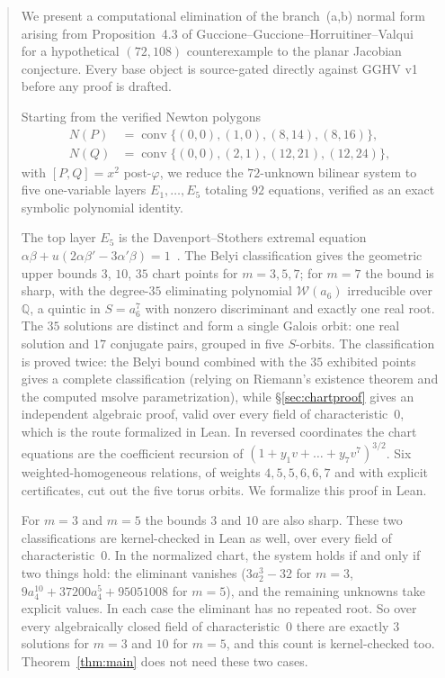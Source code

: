 \documentclass[a4paper,11pt]{article}
\theoremstyle{plain}
\theoremstyle{definition}
\theoremstyle{remark}
\begin{document}
\begin{abstract}
We present a computational elimination of the branch~(a,b) normal form arising from Proposition~4.3 of Guccione--Guccione--Horruitiner--Valqui~\cite{GGHV} for a hypothetical $(72,108)$ counterexample to the planar Jacobian conjecture. Every base object is source-gated directly against GGHV v1 before any proof is drafted.

Starting from the verified Newton polygons
\[
\begin{aligned}
N(P)&=\operatorname{conv}\{(0,0),(1,0),(8,14),(8,16)\},\\
N(Q)&=\operatorname{conv}\{(0,0),(2,1),(12,21),(12,24)\},
\end{aligned}
\]
with $[P,Q]=x^2$ post-$\varphi$, we reduce the $72$-unknown bilinear system to five one-variable layers $E_1,\dots,E_5$ totaling $92$ equations, verified as an exact symbolic polynomial identity.

The top layer $E_5$ is the Davenport--Stothers extremal equation $\alpha\beta+u(2\alpha\beta'-3\alpha'\beta)=1$~\cite{Stothers,Davenport}. The Belyi classification gives the geometric upper bounds $3$, $10$, $35$ chart points for $m=3,5,7$; for $m=7$ the bound is sharp, with the degree-$35$ eliminating polynomial $\mathcal{W}(a_6)$ irreducible over $\mathbb{Q}$, a quintic in $S=a_6^7$ with nonzero discriminant and exactly one real root. The $35$ solutions are distinct and form a single Galois orbit: one real solution and $17$ conjugate pairs, grouped in five $S$-orbits. The classification is proved twice: the Belyi bound combined with the $35$ exhibited points gives a complete classification (relying on Riemann's existence theorem and the computed msolve parametrization), while \S\ref{sec:chartproof} gives an independent algebraic proof, valid over every field of characteristic~$0$, which is the route formalized in Lean. In reversed coordinates the chart equations are the coefficient recursion of $(1+y_1v+\dots+y_7v^7)^{3/2}$. Six weighted-homogeneous relations, of weights $4,5,5,6,6,7$ and with explicit certificates, cut out the five torus orbits. We formalize this proof in Lean.

For $m=3$ and $m=5$ the bounds $3$ and $10$ are also sharp. These two classifications are kernel-checked in Lean as well, over every field of characteristic~$0$. In the normalized chart, the system holds if and only if two things hold: the eliminant vanishes ($3a_2^3-32$ for $m=3$, $9a_4^{10}+37200a_4^5+95051008$ for $m=5$), and the remaining unknowns take explicit values. In each case the eliminant has no repeated root. So over every algebraically closed field of characteristic~$0$ there are exactly $3$ solutions for $m=3$ and $10$ for $m=5$, and this count is kernel-checked too. Theorem~\ref{thm:main} does not need these two cases.


\end{abstract}
\end{document}
